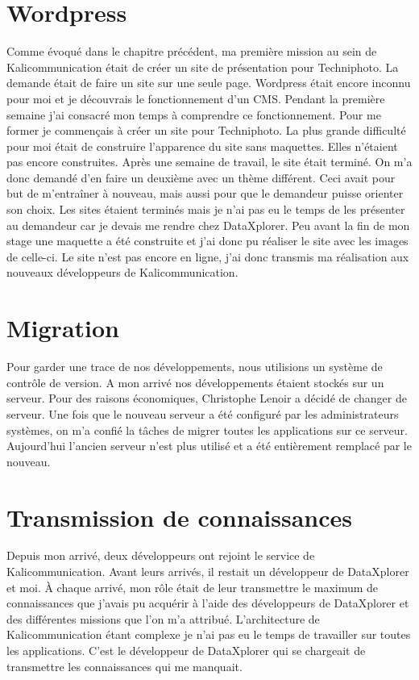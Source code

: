 
\section{Wordpress}
Comme évoqué dans le chapitre précédent, ma première mission au sein de Kalicommunication était de créer un site de présentation pour Techniphoto. La demande était de faire un site sur une seule page. Wordpress était encore inconnu pour moi et je découvrais le fonctionnement d'un CMS. Pendant la première semaine j'ai consacré mon temps à comprendre ce fonctionnement. Pour me former je commençais à créer un site pour Techniphoto. La plus grande difficulté pour moi était de construire l'apparence du site sans maquettes. Elles n'étaient pas encore construites.\newline
Après une semaine de travail, le site était terminé. On m'a donc demandé d'en faire un deuxième avec un thème différent. Ceci avait pour but de m'entraîner à nouveau, mais aussi pour que le demandeur puisse orienter son choix.\newline
Les sites étaient terminés mais je n'ai pas eu le temps de les présenter au demandeur car je devais me rendre chez DataXplorer.
Peu avant la fin de mon stage une maquette a été construite et j'ai donc pu réaliser le site avec les images de celle-ci. Le site n'est pas encore en ligne, j'ai donc transmis ma réalisation aux nouveaux développeurs de Kalicommunication.

\section{Migration}
Pour garder une trace de nos développements, nous utilisions un système de contrôle de version. A mon arrivé nos développements étaient stockés sur un serveur. Pour des raisons économiques, Christophe Lenoir a décidé de changer de serveur. Une fois que le nouveau serveur a été configuré par les administrateurs systèmes, on m'a confié la tâches de migrer toutes les applications sur ce serveur. Aujourd'hui l'ancien serveur n'est plus utilisé et a été entièrement remplacé par le nouveau.

\section{Transmission de connaissances}
Depuis mon arrivé, deux développeurs ont rejoint le service de Kalicommunication. Avant leurs arrivés, il restait un développeur de DataXplorer et moi. À chaque arrivé, mon rôle était de leur transmettre le maximum de connaissances que j'avais pu acquérir à l'aide des développeurs de DataXplorer et des différentes missions que l'on m'a attribué. L'architecture de Kalicommunication étant complexe je n'ai pas eu le temps de travailler sur toutes les applications. C'est le développeur de DataXplorer qui se chargeait de transmettre les connaissances qui me manquait.

